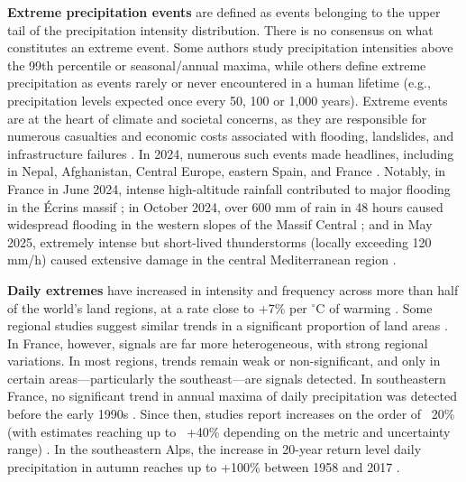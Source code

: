 ﻿\documentclass[hess, manuscript]{copernicus}
\begin{document}
\textbf{Extreme precipitation events} are defined as events belonging to the upper tail of the precipitation intensity distribution. There is no consensus
on what constitutes an extreme event. Some authors study
precipitation intensities above the 99th percentile or seasonal/annual
maxima, while others define extreme precipitation as events rarely or
never encountered in a human lifetime (e.g., precipitation levels
expected once every 50, 100 or 1,000 years). Extreme events are at the heart of climate and societal concerns, as they are responsible for numerous casualties and economic costs associated with flooding, landslides, and infrastructure failures \citep{IPCC_2022_WGIII}.
In 2024, numerous such events made headlines,
including in Nepal, Afghanistan, Central Europe, eastern Spain, and
France \citep{wmo2024}. Notably, in France in June
2024, intense high-altitude rainfall contributed to major flooding in
the Écrins massif \citep{Blanc2024}; in October 2024, over 600 mm of
rain in 48 hours caused widespread flooding in the western slopes of the Massif Central
\citep{MeteoFrance2024_episodesArdeches}; and in May 2025, extremely intense but short-lived
thunderstorms (locally exceeding 120 mm/h) caused extensive damage in
the central Mediterranean region \citep{MeteoFrance2025}.

\textbf{Daily extremes} have increased in intensity and
frequency across more than half of the world's land regions, at a rate
close to +7\% per $^\circ$C of warming \citep{IPCC2021}. Some regional studies
suggest similar trends in a significant proportion of land areas \citep{Donat2016}. In France, however, signals are far more
heterogeneous, with strong
regional variations. In most regions, trends remain weak or
non-significant, and only in certain areas---particularly the
southeast---are signals detected. In southeastern France, no significant trend in annual maxima of daily precipitation was detected before the early 1990s \citep{blanchet-creutin-2022}. Since then, studies report increases on the order of ~20\% (with estimates reaching up to ~+40\% depending on the metric and uncertainty range) \citep{Ribes2019,Blanchet2018,blanchet-creutin-2022}. In the southeastern Alps, the increase in 20-year return
level daily precipitation in autumn reaches up to +100\% between 1958 and 2017 \citep{blanchet2021explaining}. 
\end{document}

